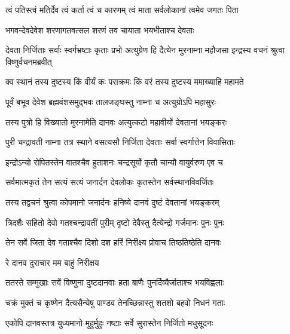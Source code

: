 \twolineshloka
{त्वं पतिस्त्वं मतिर्देव त्वं कर्ता त्वं च कारणम्}
{त्वं माता सर्वलोकानां त्वमेव जगतः पिता}%

\twolineshloka
{भगवन्देवदेवेश शरणागतवत्सल}
{शरणं तव चायाता भयभीताश्च देवताः}%


\threelineshloka
{देवता निर्जिताः सर्वाः स्वर्गभ्रष्टाः कृताः प्रभो}
{अत्युग्रेण हि दैत्येन मुरनाम्ना महौजसा}
{इन्द्रस्य वचनं श्रुत्वा विष्णुर्वचनमब्रवीत्}%



\twolineshloka
{क्व स्थानं तस्य दुष्टस्य किं वीर्यं कः पराक्रमः}
{किं वरं तस्य दुष्टस्य ममाख्याहि महामते}%


\twolineshloka
{पूर्वं बभूव देवेश ब्रह्मवंशसमुद्भवः}
{तालजङ्घस्तु नाम्ना च अत्युग्रोऽपि महासुरः}%

\twolineshloka
{तस्य पुत्रो हि विख्यातो मुरनामेति दानवः}
{अत्युत्कटो महावीर्यो देवतानां भयङ्करः}%

\twolineshloka
{पुरी चन्द्रावती नाम्ना तत्र स्थाने वसत्यसौ}
{निर्जिता देवताः सर्वा स्वर्गात्तेन विवासिताः}%

\twolineshloka
{इन्द्रोऽन्यो रोपितस्तेन वातश्चैव हुताशनः}
{चन्द्रसूर्यो कृतौ चान्यौ वायुर्वरुण एव च}%

\twolineshloka
{सर्वमात्मकृतं तेन सत्यं सत्यं जनार्दन}
{देवलोकः कृतस्तेन सर्वस्थानविवर्जितः}%

\twolineshloka
{तस्य तद्वचनं श्रुत्वा कोपमानो जनार्दनः}
{हनिष्ये दानवं दुष्टं देवतानां भयङ्करम्}%

\twolineshloka
{त्रिदशैः सहितो देवो गतश्चन्द्रावतीं पुरीम्}
{दृष्टो देवैस्तु दैत्येन्द्रो गर्जमानः पुनः पुनः}%

\twolineshloka
{तेन सर्वे जिता देव गताश्चैव दिशो दश}
{हरिं निरीक्ष्य प्रोवाच तिष्ठतिष्ठेति दानवः}%



\onelineshloka
{रे दानव दुराचार मम बाहुं निरीक्षय}%

\twolineshloka
{ततस्ते सम्मुखाः सर्वे विष्णुना दुष्टदानवाः}
{हता बाणैः पुनर्दिव्यैर्जाताश्च भयविह्वलाः}%

\twolineshloka
{चक्रं मुक्तं च कृष्णेन दैत्यसैन्येषु पाण्डव}
{तेनच्छिन्नास्तु शतशो बहवो निधनं गताः}%

\twolineshloka
{एकोपि दानवस्तत्र युध्यमानो मुहुर्मुहुः}
{नष्टाः सर्वे सुरास्तेन निर्जितो मधुसूदनः}%

